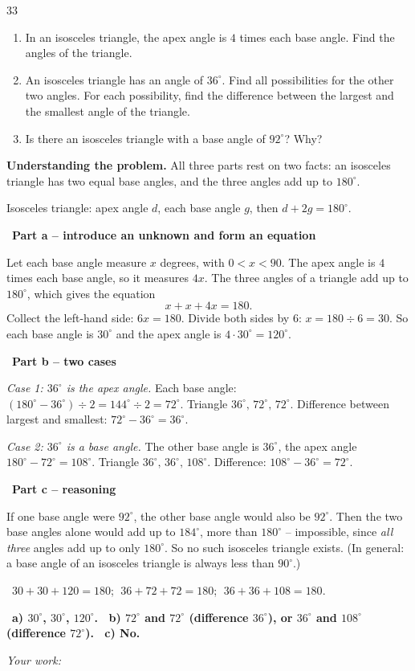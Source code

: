 \documentclass[11pt]{article}
\newif\ifsol \solfalse
\providecommand{\AnsWord}{Đáp số}
\newenvironment{probbox}[2]{\begin{probboxT}{#1}{#2}}{\end{probboxT}}
\newcommand{\StuProb}[2]{\begin{probboxS}{#1}{#2}\StuProbBody\end{probboxS}}
\newcommand{\ans}[1]{\par\smallskip{\bfseries\color{tmGreen!88!black}\AnsWord:}\ {\bfseries\color{AnsRed}#1}\par}
\newcommand{\probsol}[1]{%
  \begin{lrbox}{\solmeasure}\begin{minipage}{\dimexpr\linewidth-24pt\relax}#1\end{minipage}\end{lrbox}%
  \ifsol
    \begin{solbox}#1\end{solbox}%
  \else
    \setlength{\solht}{\dimexpr\ht\solmeasure+\dp\solmeasure+0.85cm\relax}%
    \ifdim\solht<1.35cm\setlength{\solht}{1.35cm}\fi
    \ifdim\solht>\StudentMaxWork\setlength{\solht}{\StudentMaxWork}\fi
    \par\noindent\begin{minipage}{\linewidth}%
    \expandafter\StuProb\StuProbArgs
    \begin{tcolorbox}[colback=white,colframe=Line,boxrule=0.8pt,arc=5pt,
      left=8pt,right=8pt,top=4pt,bottom=4pt,height=\solht]{\footnotesize\color{Slate}\itshape\WorkWord}\end{tcolorbox}%
    \end{minipage}\par\medskip
  \fi}
\newlength{\StudentMaxWork}\setlength{\StudentMaxWork}{4.5cm}
\newcommand{\step}[2]{\par\smallskip\noindent{\bfseries\color{tmBlue!85!black}\StepWord~#1.}\ {\bfseries #2}\par\nopagebreak}
\newcommand{\verify}[1]{\par\smallskip\noindent{\bfseries\color{tmGreen!80!black}\faCheckCircle\ \CheckWord}\ #1\par}
\def\WorkWord{Your work:}
\def\AnsWord{Answer}
\def\StepWord{Step}
\def\CheckWord{Check:}
\begin{document}
\begin{probbox}{33}{\relax}
\begin{enumerate}[label=\alph*),leftmargin=1.6em,itemsep=0pt,topsep=0pt]
  \item In an isosceles triangle, the apex angle is $4$ times each base angle. Find the angles of the triangle.
  \item An isosceles triangle has an angle of $36^\circ$. Find all possibilities for the other two angles. For each possibility, find the difference between the largest and the smallest angle of the triangle.
  \item Is there an isosceles triangle with a base angle of $92^\circ$? Why?
\end{enumerate}
\end{probbox}
\probsol{
\textbf{Understanding the problem.} All three parts rest on two facts: an isosceles triangle has two equal base angles, and the three angles add up to $180^\circ$.
\begin{recallbox}Isosceles triangle: apex angle $d$, each base angle $g$, then $d+2g=180^\circ$.\end{recallbox}
\step{1}{Part a -- introduce an unknown and form an equation}
Let each base angle measure $x$ degrees, with $0<x<90$. The apex angle is $4$ times each base angle, so it measures $4x$.
The three angles of a triangle add up to $180^\circ$, which gives the equation
\[ x+x+4x=180. \]
Collect the left-hand side: $6x=180$. Divide both sides by $6$: $x=180\div6=30$.
So each base angle is $30^\circ$ and the apex angle is $4\cdot30^\circ=120^\circ$.

\step{2}{Part b -- two cases}
\emph{Case 1: $36^\circ$ is the apex angle.} Each base angle: $(180^\circ-36^\circ)\div2=144^\circ\div2=72^\circ$. Triangle $36^\circ,\,72^\circ,\,72^\circ$. Difference between largest and smallest: $72^\circ-36^\circ=36^\circ$.

\emph{Case 2: $36^\circ$ is a base angle.} The other base angle is $36^\circ$, the apex angle $180^\circ-72^\circ=108^\circ$. Triangle $36^\circ,\,36^\circ,\,108^\circ$. Difference: $108^\circ-36^\circ=72^\circ$.

\step{3}{Part c -- reasoning}
\begin{proofbox}If one base angle were $92^\circ$, the other base angle would also be $92^\circ$. Then the two base angles alone would add up to $184^\circ$, more than $180^\circ$ -- impossible, since \emph{all three} angles add up to only $180^\circ$. So no such isosceles triangle exists. (In general: a base angle of an isosceles triangle is always less than $90^\circ$.)\end{proofbox}
\verify{$30+30+120=180$; $\;36+72+72=180$; $\;36+36+108=180$.}
\ans{a) $30^\circ$, $30^\circ$, $120^\circ$. \ b) $72^\circ$ and $72^\circ$ (difference $36^\circ$), or $36^\circ$ and $108^\circ$ (difference $72^\circ$). \ c) No.}
}
\end{document}
